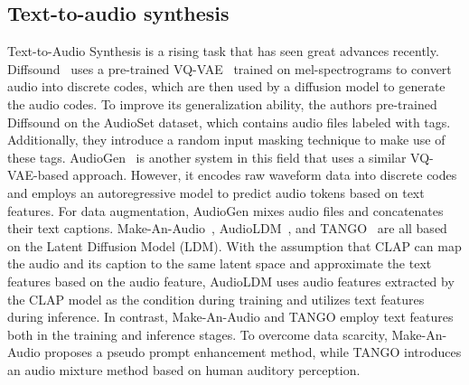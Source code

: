\documentclass{article}
\begin{document}
\subsection{Text-to-audio synthesis}
Text-to-Audio Synthesis is a rising task that has seen great advances recently. Diffsound~\cite{yangDiffsoundDiscreteDiffusion2023} uses a pre-trained VQ-VAE~\cite{van2017neural} trained on mel-spectrograms to convert audio into discrete codes, which are then used by a diffusion model to generate the audio codes. To improve its generalization ability, the authors pre-trained Diffsound on the AudioSet dataset, which contains audio files labeled with tags. Additionally, they introduce a random input masking technique to make use of these tags. AudioGen~\cite{kreukAudioGenTextuallyGuided2023} is another system in this field that uses a similar VQ-VAE-based approach. However, it encodes raw waveform data into discrete codes and employs an autoregressive model to predict audio tokens based on text features. For data augmentation, AudioGen mixes audio files and concatenates their text captions.
Make-An-Audio~\cite{huang2023makeanaudio}, AudioLDM~\cite{liuAudioLDMTexttoAudioGeneration2023}, and TANGO~\cite{ghosal2023texttoaudio} are all based on the Latent Diffusion Model (LDM). With the assumption that CLAP can map the audio and its caption to the same latent space and approximate the text features based on the audio feature, AudioLDM uses audio features extracted by the CLAP model as the condition during training and utilizes text features during inference. In contrast, Make-An-Audio and TANGO employ text features both in the training and inference stages. To overcome data scarcity, Make-An-Audio proposes a pseudo prompt enhancement method, while TANGO introduces an audio mixture method based on human auditory perception.
\end{document}
